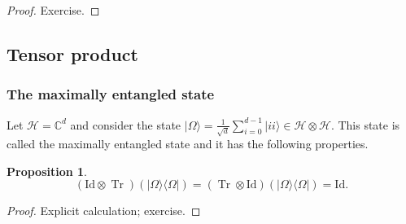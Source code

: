 \documentclass{article}
\newtheorem{proposition}{Proposition}
\theoremstyle{definition}
\newcommand{\tr}{\operatorname{Tr}}
\newcommand{\id}{\mathrm{Id}}
\newcommand{\ket}[1]{\vert #1 \rangle}
\newcommand{\bra}[1]{\langle #1 \vert}
\begin{document}
\begin{proof}
  Exercise.
\end{proof}

\subsection{Tensor product}

\subsubsection{The maximally entangled state}

Let $\mathcal{H} = \mathbb{C}^d$ and consider the state $\ket{\Omega} = \frac{1}{\sqrt{d}}\sum_{i=0}^{d-1} \ket{ii}\in\mathcal{H}\otimes\mathcal{H}$. This state is called the maximally entangled state and it has the following properties.


\begin{proposition}\label{prop:max_ent_partial_tr}
  \begin{equation*}
    (\id \otimes \tr )(\ket{\Omega}\bra{\Omega}) = (\tr \otimes\id)(\ket{\Omega}\bra{\Omega})  = \id.
  \end{equation*}
\end{proposition}

\begin{proof}
  Explicit calculation; exercise.
\end{proof}
\end{document}
